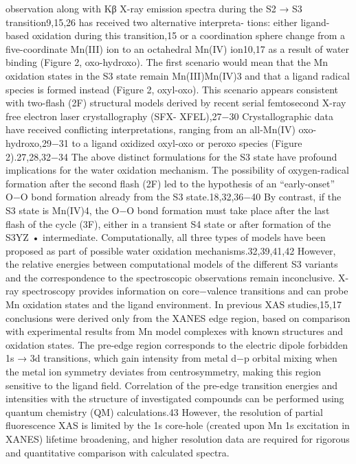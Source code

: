 \documentclass{article}
\begin{document}
observation along with Kβ X-ray emission spectra during the S2
→ S3 transition9,15,26 has received two alternative interpreta-
tions: either ligand-based oxidation during this transition,15 or
a coordination sphere change from a five-coordinate Mn(III)
ion to an octahedral Mn(IV) ion10,17 as a result of water
binding (Figure 2, oxo-hydroxo). The first scenario would
mean that the Mn oxidation states in the S3 state remain
Mn(III)Mn(IV)3 and that a ligand radical species is formed
instead (Figure 2, oxyl-oxo). This scenario appears consistent
with two-flash (2F) structural models derived by recent serial
femtosecond X-ray free electron laser crystallography (SFX-
XFEL),27−30 Crystallographic data have received conflicting
interpretations, ranging from an all-Mn(IV) oxo-hydroxo,29−31
to a ligand oxidized oxyl-oxo or peroxo species (Figure
2).27,28,32−34
The above distinct formulations for the S3 state have
profound implications for the water oxidation mechanism. The
possibility of oxygen-radical formation after the second flash
(2F) led to the hypothesis of an “early-onset” O−O bond
formation already from the S3 state.18,32,36−40 By contrast, if
the S3 state is Mn(IV)4, the O−O bond formation must take
place after the last flash of the cycle (3F), either in a transient
S4 state or after formation of the S3YZ
• intermediate.
Computationally, all three types of models have been proposed
as part of possible water oxidation mechanisms.32,39,41,42
However, the relative energies between computational models
of the different S3 variants and the correspondence to the
spectroscopic observations remain inconclusive.
X-ray spectroscopy provides information on core−valence
transitions and can probe Mn oxidation states and the ligand
environment. In previous XAS studies,15,17 conclusions were
derived only from the XANES edge region, based on
comparison with experimental results from Mn model
complexes with known structures and oxidation states. The
pre-edge region corresponds to the electric dipole forbidden 1s
→ 3d transitions, which gain intensity from metal d−p orbital
mixing when the metal ion symmetry deviates from
centrosymmetry, making this region sensitive to the ligand
field. Correlation of the pre-edge transition energies and
intensities with the structure of investigated compounds can be
performed using quantum chemistry (QM) calculations.43
However, the resolution of partial fluorescence XAS is limited
by the 1s core-hole (created upon Mn 1s excitation in XANES)
lifetime broadening, and higher resolution data are required for
rigorous and quantitative comparison with calculated spectra.
\end{document}
